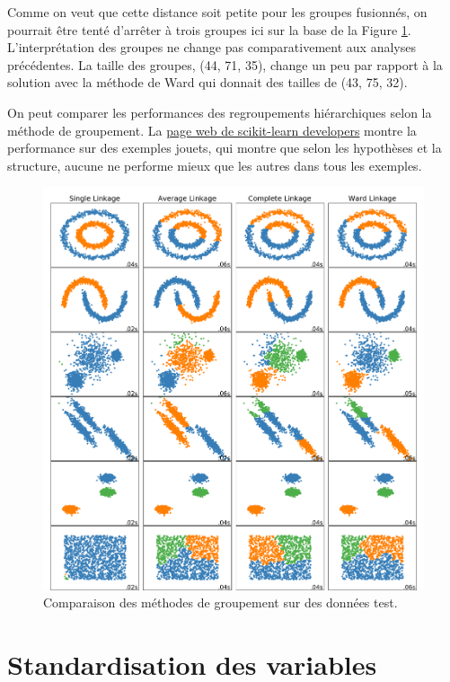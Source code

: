 \documentclass[
  11pt,
  letterpaper,
]{book}
\theoremstyle{definition}
\theoremstyle{definition}
\theoremstyle{definition}
\theoremstyle{definition}
\theoremstyle{remark}
\begin{document}
Comme on veut que cette distance soit petite pour les groupes fusionnés, on pourrait être tenté d'arrêter à trois groupes ici sur la base de la Figure \ref{fig:fig4-e20}. L'interprétation des groupes ne change pas comparativement aux analyses précédentes. La taille des groupes, (44, 71, 35), change un peu par rapport à la solution avec la méthode de Ward qui donnait des tailles de (43, 75, 32).

On peut comparer les performances des regroupements hiérarchiques selon la méthode de groupement. La \href{https://scikit-learn.org/stable/auto_examples/cluster/plot_linkage_comparison.html}{page web de scikit-learn developers} montre la performance sur des exemples jouets, qui montre que selon les hypothèses et la structure, aucune ne performe mieux que les autres dans tous les exemples.

\begin{figure}

{\centering \includegraphics[width=0.8\linewidth]{figures/04-clustering-e20} 

}

\caption{Comparaison des méthodes de groupement sur des données test.}\label{fig:fig4-e20}
\end{figure}

\hypertarget{standardisation-des-variables}{%
\section{Standardisation des variables}\label{standardisation-des-variables}}
\end{document}
